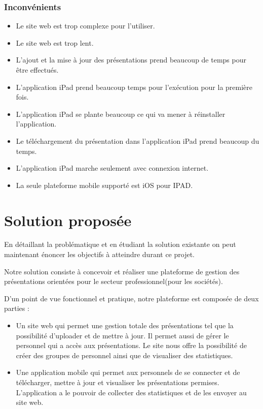 \documentclass[12pt, ChapStyle1, oneside]{./Styles/Dea_Gsm}
\begin{document}
\subsubsection{Inconvénients}
\begin{itemize}
    \item Le site web est trop complexe pour l’utiliser.
    \item Le site web est trop lent.
    \item L’ajout et la mise à jour des présentations prend beaucoup de temps pour être effectués.
    \item L’application iPad prend beaucoup temps pour l’exécution pour la première fois.
    \item L’application iPad se plante beaucoup ce qui va mener à réinstaller l’application.
    \item Le téléchargement du présentation dans l’application iPad prend beaucoup du temps.
    \item L’application iPad marche seulement avec connexion internet.
    \item La seule plateforme mobile supporté est iOS pour IPAD.
\end{itemize}
\section{Solution proposée}
En détaillant la problématique et en étudiant la solution existante on peut maintenant énoncer les objectifs à atteindre durant ce projet.

Notre solution consiste à concevoir et réaliser une plateforme de gestion des présentations orientées pour le secteur professionnel(pour les sociétés).

D’un point de vue fonctionnel et pratique, notre plateforme est composée de deux parties :
\begin{itemize}
\item Un site web qui permet une gestion totale des présentations tel que la possibilité d'uploader et de mettre à jour. Il permet aussi de gérer le personnel qui a accès aux présentations. Le site nous offre la possibilité de créer des groupes de personnel ainsi que de visualiser des statistiques.
\item Une application mobile qui permet aux personnels de se connecter et de télécharger, mettre à jour et visualiser les présentations permises. L’application a le pouvoir de collecter des statistiques et de les envoyer au site web.
\end{itemize}
\end{document}
